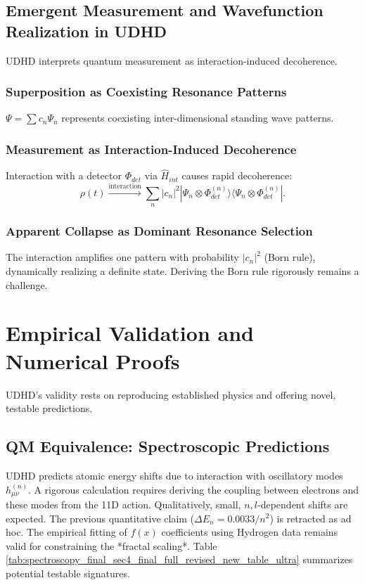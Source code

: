 \documentclass[12pt, a4paper]{article} %
\begin{document}
\subsection{Emergent Measurement and Wavefunction Realization in UDHD}
UDHD interprets quantum measurement as interaction-induced decoherence.
\subsubsection*{Superposition as Coexisting Resonance Patterns}
\( \Psi = \sum c_n \Psi_n \) represents coexisting inter-dimensional standing wave patterns.
\subsubsection*{Measurement as Interaction-Induced Decoherence}
Interaction with a detector \( \Phi_{det} \) via \( \hat{H}_{int} \) causes rapid decoherence:
\begin{equation}
\rho(t) \xrightarrow{\text{interaction}} \sum_n |c_n|^2 |\Psi_n \otimes \Phi_{det}^{(n)} \rangle \langle \Psi_n \otimes \Phi_{det}^{(n)}|.
\label{eq:decoherence_final_full_ultra}
\end{equation}
\subsubsection*{Apparent Collapse as Dominant Resonance Selection}
The interaction amplifies one pattern with probability \( |c_n|^2 \) (Born rule), dynamically realizing a definite state. Deriving the Born rule rigorously remains a challenge.

\section{Empirical Validation and Numerical Proofs}
\label{sec:empirical_validation}
UDHD's validity rests on reproducing established physics and offering novel, testable predictions.

\subsection{QM Equivalence: Spectroscopic Predictions}
UDHD predicts atomic energy shifts due to interaction with oscillatory modes \(h_{\mu\nu}^{(n)}\). A rigorous calculation requires deriving the coupling between electrons and these modes from the 11D action. Qualitatively, small, \(n,l\)-dependent shifts are expected. The previous quantitative claim (\(\Delta E_n = 0.0033/n^2\)) is retracted as ad hoc. The empirical fitting of \(f(x)\) coefficients using Hydrogen data remains valid for constraining the *fractal scaling*. Table \ref{tab:spectroscopy_final_sec4_final_full_revised_new_table_ultra} summarizes potential testable signatures.
\end{document}
